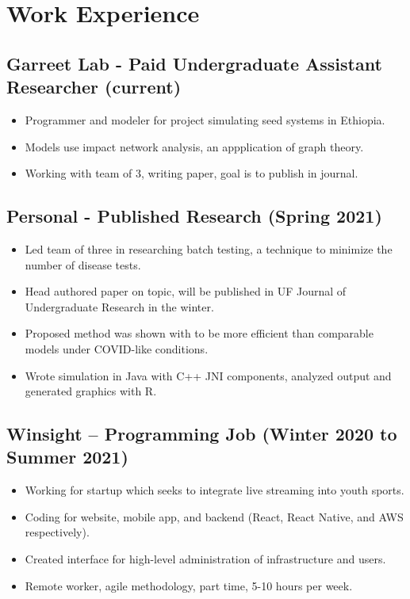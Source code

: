 \documentclass{article}
\newenvironment{CustomItemize}
{ \begin{itemize}[leftmargin=0em]
    \setlength{\itemsep}{0pt}
    \setlength{\parskip}{0pt}
    \setlength{\parindent}{0pt}
    \setlength{\parsep}{0pt}     }
{ \end{itemize}                  }
\begin{document}

\section{Work Experience}

\subsection{Garreet Lab - Paid Undergraduate Assistant Researcher (current)}
\begin{CustomItemize}
\item Programmer and modeler for project simulating seed systems in Ethiopia.
\item Models use impact network analysis, an appplication of graph theory.
\item Working with team of 3, writing paper, goal is to publish in journal.
\end{CustomItemize}

\subsection{Personal - Published Research (Spring 2021)}
\begin{CustomItemize}
\item Led team of three in researching batch testing, a technique to minimize the number of disease tests.
\item Head authored paper on topic, will be published in UF Journal of Undergraduate Research in the winter.
\item Proposed method was shown with to be more efficient than comparable models under COVID-like conditions.
\item Wrote simulation in Java with C++ JNI components, analyzed output and generated graphics with R.
\end{CustomItemize}

\subsection{Winsight – Programming Job (Winter 2020 to Summer 2021)}
\begin{CustomItemize}
\item Working for startup which seeks to integrate live streaming into youth sports.
\item Coding for website, mobile app, and backend (React, React Native, and AWS respectively).
\item Created interface for high-level administration of infrastructure and users.
\item Remote worker, agile methodology, part time, 5-10 hours per week.
\end{CustomItemize}
\end{document}
